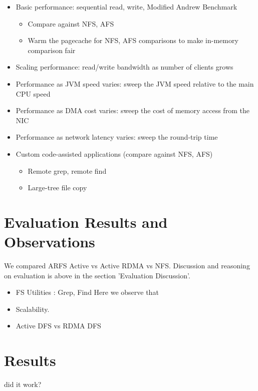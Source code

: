 \documentclass[10pt]{article}
\begin{document}
\begin{itemize}
\item Basic performance: sequential read, write, Modified Andrew
  Benchmark
\begin{itemize}
\item Compare against NFS, AFS
\item Warm the pagecache for NFS, AFS comparisons to make in-memory
  comparison fair
\end{itemize}
\item Scaling performance: read/write bandwidth as number of clients grows
\item Performance as JVM speed varies: sweep the JVM speed relative to
  the main CPU speed
\item Performance as DMA cost varies: sweep the cost of memory access
  from the NIC
\item Performance as network latency varies: sweep the round-trip time
\item Custom code-assisted applications (compare against NFS, AFS)
\begin{itemize}
\item Remote grep, remote find
\item Large-tree file copy
\end{itemize}
\end{itemize}

\section{Evaluation Results and Observations}
We compared ARFS Active vs Active RDMA vs NFS. Discussion and reasoning 
on evaluation is above in the section 'Evaluation Discussion'.

\begin{itemize}
\item FS Utilities : Grep, Find
Here we observe that 
\item Scalability.
\item Active DFS vs RDMA DFS
\end{itemize}

\section{Results}
did it work?
\end{document}
